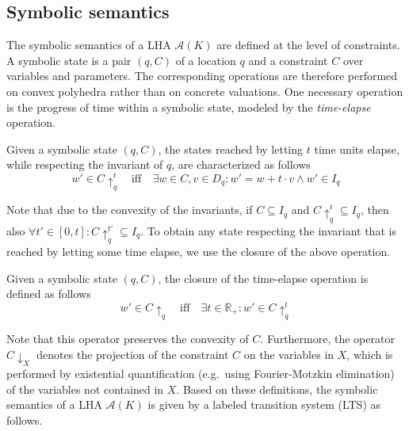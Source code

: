 \documentclass{llncs}
\newcommand{\A}{\ensuremath{\mathcal{A}}}
\newcommand{\Reals}{\ensuremath{\mathbb{R}}}
\newcommand{\project}[1]{\ensuremath{\downarrow_{#1}}}
\newcommand{\telapse}{\ensuremath{\uparrow}}
\begin{document}
\subsection{Symbolic semantics}
The symbolic semantics of a LHA $\A(K)$ are defined at the level of
constraints. A symbolic state is a pair $(q,C)$ of a location $q$ and
a constraint $C$ over variables and parameters. The corresponding
operations are therefore performed on convex polyhedra rather than on
concrete valuations. One necessary operation is the progress of time
within a symbolic state, modeled by the \emph{time-elapse} operation.

\begin{definition}\label{def:telapse_qt}
Given a symbolic state $(q,C)$, the states reached by letting $t$ time
units elapse, while respecting the invariant of $q$, are characterized
as follows
\begin{equation*}
  w' \in C \telapse_{q}^{t} \quad \text{iff} \quad \exists w \in C, v \in D_q: w' = w + t\cdot v \wedge w' \in I_q
\end{equation*}
\end{definition}

Note that due to the convexity of the invariants, if $C \subseteq I_q$
and $C\telapse_{q}^{t} \subseteq I_q$, then also $\forall t' \in
[0,t]: C\telapse_{q}^{t'} \subseteq I_q$. To obtain any state
respecting the invariant that is reached by letting some time elapse,
we use the closure of the above operation.

\begin{definition}\label{def:telapse}
Given a symbolic state $(q,C)$, the closure of the time-elapse
operation is defined as follows
\begin{equation*}
  w' \in C \telapse_{q} \quad \text{iff} \quad \exists t \in \Reals_+: w' \in C \telapse_{q}^{t}
\end{equation*}
\end{definition}

Note that this operator preserves the convexity of $C$.
Furthermore, the operator $C \project{X}$ denotes the projection of the
constraint $C$ on the variables in $X$, which is performed by
existential quantification (e.g.~using Fourier-Motzkin elimination) of
the variables not contained in $X$. Based on these definitions, the
symbolic semantics of a LHA $\A(K)$ is given by a labeled transition
system (LTS) as follows.
\end{document}
